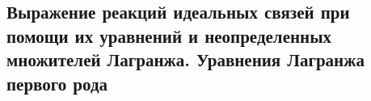 

\subsection{Выражение реакций идеальных связей при помощи их уравнений и неопределенных множителей Лагранжа. Уравнения Лагранжа первого рода}



